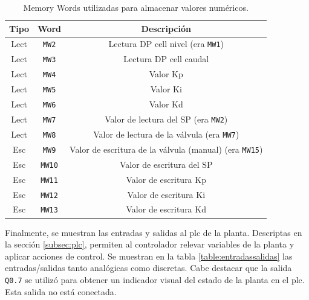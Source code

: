 \begin{table}[!t]

\renewcommand{\arraystretch}{1.3}
\centering
\begin{tabular}{c||c||c}
\hline
\bfseries Tipo & \bfseries Word  & \bfseries Descripción\\
\hline \hline
Lect & \verb|MW2|  & Lectura DP cell nivel (era \verb|MW1|)\\
Lect & \verb|MW3|  & Lectura DP cell caudal\\
Lect & \verb|MW4|  & Valor Kp\\
Lect & \verb|MW5|  & Valor Ki\\
Lect & \verb|MW6|  & Valor Kd\\
Lect & \verb|MW7|  & Valor de lectura del SP (era \verb|MW2|)\\
Lect & \verb|MW8|  & Valor de lectura de la válvula (era \verb|MW7|)\\
\hline
Esc & \verb|MW9| & Valor de escritura de la válvula (manual) (era 
\verb|MW15|) \\
Esc & \verb|MW10|  & Valor de escritura del SP \\
Esc & \verb|MW11|  & Valor de escritura Kp \\
Esc & \verb|MW12|  & Valor de escritura Ki \\
Esc & \verb|MW13| & Valor de escritura Kd \\
\hline
\end{tabular}
\caption{Memory Words utilizadas para almacenar valores numéricos.}
\label{table:mwNumericos}
\end{table}

Finalmente, se muestran las entradas y salidas al \gls{plc} de la planta.
Descriptas en la sección \ref{subsec:plc}, permiten al
controlador relevar variables de la planta y aplicar acciones de control. 
Se muestran en la tabla \ref{table:entradassalidas} las
entradas/salidas tanto analógicas como discretas.
Cabe destacar que la salida \verb|Q0.7| se utilizó para obtener un indicador
visual del estado de la planta en el plc.
Esta salida no está conectada.

